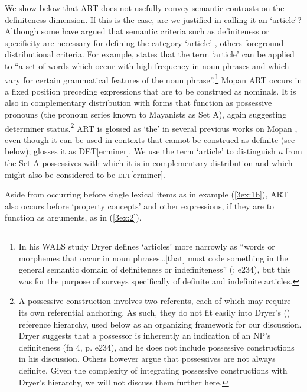 \documentclass[output=paper]{langsci/langscibook}
\begin{document}
{
We show below that ART does not usefully convey semantic contrasts on the definiteness dimension. If this is the case, are we justified in calling it an `article'?  Although some have argued that semantic criteria such as definiteness or specificity are necessary for defining the category `article' \citep[e.\,g.,][833-4]{himmelmann:08}, others foreground distributional criteria.  For example, \cite[][158]{dryer:07} states that the term `article' can be applied to ``a set of words which occur with high frequency in noun phrases and which vary for certain grammatical features of the noun phrase''.\footnote{In his WALS study Dryer defines `articles' more narrowly as ``words or morphemes that occur in noun phrases…[that] must code something in the general semantic domain of definiteness or indefiniteness'' (\citeyear{dryer:14}: e234), but this was for the purpose of surveys specifically of definite and indefinite articles.} Mopan ART occurs in a fixed position preceding expressions that are to be construed as nominals. It is also in complementary distribution with forms that function as possessive pronouns (the pronoun series known to Mayanists as Set A), again suggesting determiner status.\footnote{A possessive construction involves two referents, each of which may require its own referential anchoring.  As such, they do not fit easily into Dryer's (\citeyear{dryer:14}) reference hierarchy, used below as an organizing framework for our discussion. Dryer suggests that a possessor is inherently an indication of an NP's definiteness (fn 4, p. e234), and he does not include possessive constructions in his discussion. Others however \citep[e.\,g.,][]{alexiadou:05} argue that possessives are not always definite. Given the complexity of integrating possessive constructions with Dryer's hierarchy, we will not discuss them further here.}  ART is glossed as `the' in several previous works on Mopan \citep{shaw:71,ulrich:ulrich:82,ulrich:ulrich:peck:86}, even though it can be used in contexts that cannot be construed as definite (see  below); \cite{hofling:06} glosses it as DET[erminer]. We use the term `article' to distinguish {\emph{a}} from the Set A possessives with which it is in complementary distribution and which might also be considered to be {\textsc{det}}[erminer].
}

Aside from occurring before single lexical items as in example (\ref{3ex:1b}), ART also occurs  before `property concepts' and other expressions, if they are to function as arguments, as in (\ref{3ex:2}).
\end{document}
